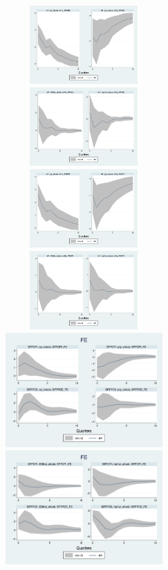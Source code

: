 \documentclass[]{article}
\begin{document}
\begin{figure}[ht]
	\centering
	\includegraphics[width=6cm,height=3cm]{figures/CPIAU_ashocks_nmp.png}  
	\includegraphics[width=6cm,height=3cm]{figures/CPIAU_ashocks.png} \\
	\includegraphics[width=6cm,height=3cm]{figures/PCEPI_ashocks_nmp.png} 
	\includegraphics[width=6cm,height=3cm]{figures/PCEPI_ashocks.png}  \\
	\smallskip
	\includegraphics[width=6cm]{figures/SPFFE_ashocks_nmp.png} 
	\includegraphics[width=6cm]{figures/SPFFE_ashocks.png} \\

\end{figure}
\end{document}
